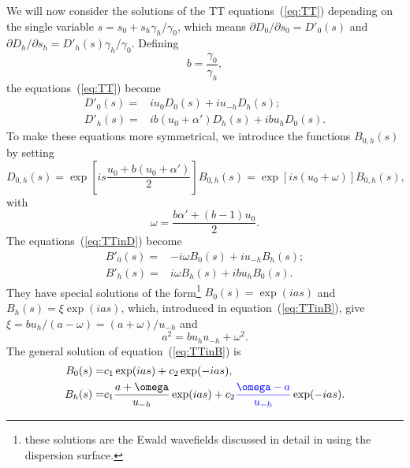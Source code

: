 \documentclass[preprint]{iucr}              %
\newcommand{\inblue}[1]{{\color{blue}#1}}
\begin{document}
We will now consider the solutions of the TT equations~(\ref{eq:TT}) depending on the single variable $s=s_0+s_h \gamma_h/\gamma_0$, which means 
$\partial D_{0} / \partial  s_{0}=D'_{0}(s)$ and $\partial D_{h} / \partial s_{h}=D'_{h}(s)\gamma_h/\gamma_0$.
Defining 
\begin{equation}\label{eq:b}
b = \frac{\gamma_0}{\gamma_h},    
\end{equation}
the equations~(\ref{eq:TT}) become
\begin{subequations}
\label{eq:TTinD}
\begin{align}
D'_0(s) =& i u_0 D_0(s) + i u_{-h} D_h(s); \\
D'_h(s) =& i b (u_0 + \alpha') D_h(s) + i b u_{h} D_0(s).
\end{align}
\end{subequations}
\inblue{To make these equations more symmetrical, we} introduce the functions $B_{0,h}(s)$ by setting
\begin{equation}
\label{eq:Bdefinition}
D_{0,h}(s) = 
\exp \left[ i s \frac{u_0 + b (u_0+\alpha')}{2} \right] B_{0,h}(s) = 
\exp[i s (u_0+\omega)] B_{0,h}(s),  
\end{equation}
with
\begin{equation}\label{eq:omega}
    \omega=\frac{ b \alpha' + (b-1) u_0}{2}.
\end{equation}
\inblue{The
equations~(\ref{eq:TTinD}) become} 
\begin{subequations}
\label{eq:TTinB}
\begin{align}
B'_0(s) =& -i \omega B_0(s) + i u_{-h} B_h(s); \\
B'_h(s) =& i \omega B_h(s) + i b u_{h} B_0(s).
\end{align}
\end{subequations}
They have special solutions of the form\footnote{these solutions are the Ewald wavefields discussed in detail in \cite{authierbook} using the dispersion surface.} $B_0(s)=\exp(i a s)$ and $B_h(s)=\xi \exp(i a s)$, which, introduced in equation~(\ref{eq:TTinB}), give $\xi=bu_h/(a-\omega)=(a+\omega)/u_{-h}$ and 
\begin{equation}\label{eq:a}
    a^2=b u_h u_{-h}+\omega^2.
\end{equation}
The general solution of equation~(\ref{eq:TTinB}) is
\begin{subequations}
\label{eq:BSolutions}
\begin{align}
B_0(s) = &c_1 \exp(i a s) + c_2 \exp(-i a s), \\
B_h(s) = &c_1 \frac{a+\omega}{u_{-h}} \exp(i a s) + c_2 
\inblue{\frac{\omega-a}{u_{-h}}} \exp(-i a s).
\end{align}
\end{subequations}
\end{document}
